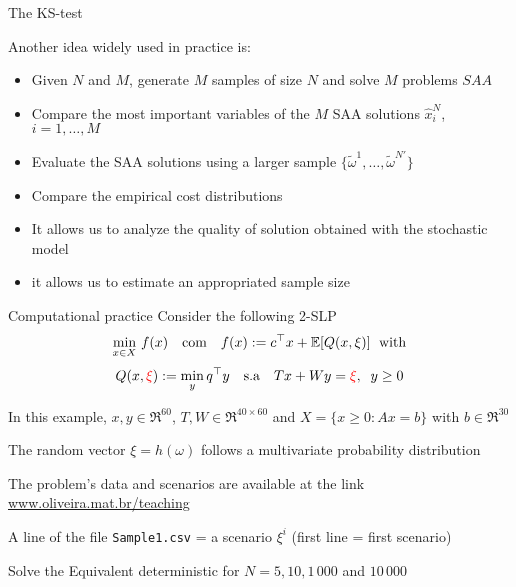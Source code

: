 \begin{frame}{The KS-test}

Another idea widely used in practice is:
\begin {itemize}
\item Given $ N $ and $ M $, generate $ M $  samples of size $ N $ and solve $ M $ problems $ SAA $
\pula

\item Compare the most important variables of the $ M $  SAA solutions $ \hat x^N_i$, $ i = 1, \ldots, M$
\pula

\item Evaluate the SAA solutions using a larger sample $\{ \tilde \omega^1, \ldots, \tilde \omega^{N'} \}$
\pula

\item Compare the empirical cost distributions
\end{itemize}
\pula


\pula
{}
\begin{itemize}
\item It allows  us to analyze the quality of solution obtained with the stochastic model
\pula

\item it allows us to estimate an appropriated sample size
\end{itemize}
\end{frame} 

\begin{frame}{Computational practice}
Consider the following 2-SLP\[
 \min_{x \in  X}\,f(x)\quad\mbox{com}\quad f(x):=c^\top  x + \mathbb{E}[Q(x, \xi)]\; \mbox{ with}
\]
\[
 Q(x, {\color{red}\xi}):=\min_{y} q^{\top}  y \quad \mbox{s.a} \quad Tx + Wy ={\color{red}\xi},\;\; y\geq 0
\]

In this example, $x,y \in \Re^{60}$, $T,W \in \Re^{40\times 60}$ and $X=\{x\geq0: Ax=b\}$ with $b \in \Re^{30}$
\pula

The random vector $\xi=h(\omega)$ follows a multivariate probability distribution
\pula

The problem's data and scenarios are available at the link \url{www.oliveira.mat.br/teaching}
\pula

A line of the file {\tt Sample1.csv}  = a scenario $\xi^i$  (first line = first scenario)

\pula Solve the Equivalent deterministic for $N = 5, 10, 1\,000$ and $10\,000$  
\end{frame}


